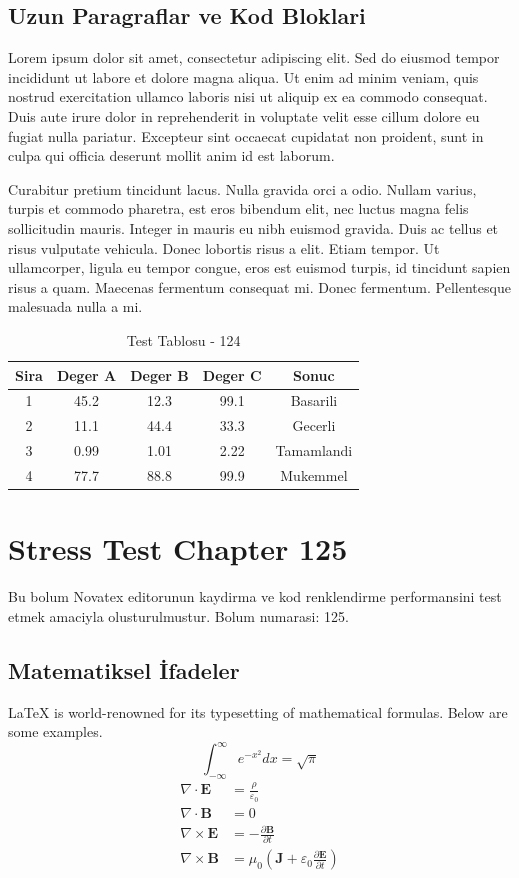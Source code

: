 \documentclass[12pt,a4paper]{article}
\begin{document}
\subsection{Uzun Paragraflar ve Kod Bloklari}
Lorem ipsum dolor sit amet, consectetur adipiscing elit. Sed do eiusmod tempor incididunt ut labore et dolore magna aliqua. Ut enim ad minim veniam, quis nostrud exercitation ullamco laboris nisi ut aliquip ex ea commodo consequat. Duis aute irure dolor in reprehenderit in voluptate velit esse cillum dolore eu fugiat nulla pariatur. Excepteur sint occaecat cupidatat non proident, sunt in culpa qui officia deserunt mollit anim id est laborum.

Curabitur pretium tincidunt lacus. Nulla gravida orci a odio. Nullam varius, turpis et commodo pharetra, est eros bibendum elit, nec luctus magna felis sollicitudin mauris. Integer in mauris eu nibh euismod gravida. Duis ac tellus et risus vulputate vehicula. Donec lobortis risus a elit. Etiam tempor. Ut ullamcorper, ligula eu tempor congue, eros est euismod turpis, id tincidunt sapien risus a quam. Maecenas fermentum consequat mi. Donec fermentum. Pellentesque malesuada nulla a mi.

\begin{table}[h!]
\centering
\begin{tabular}{|c|c|c|c|c|}
\hline
\textbf{Sira} & \textbf{Deger A} & \textbf{Deger B} & \textbf{Deger C} & \textbf{Sonuc} \\
\hline
1 & 45.2 & 12.3 & 99.1 & Basarili \\
2 & 11.1 & 44.4 & 33.3 & Gecerli \\
3 & 0.99 & 1.01 & 2.22 & Tamamlandi \\
4 & 77.7 & 88.8 & 99.9 & Mukemmel \\
\hline
\end{tabular}
\caption{Test Tablosu - 124}
\end{table}

\newpage
\section{Stress Test Chapter 125}
Bu bolum Novatex editorunun kaydirma ve kod renklendirme performansini test etmek amaciyla olusturulmustur. Bolum numarasi: 125.

\subsection{Matematiksel İfadeler}
\LaTeX{} is world-renowned for its typesetting of mathematical formulas. Below are some examples.
\begin{equation}
\int_{-\infty}^{\infty} e^{-x^2} dx = \sqrt{\pi}
\end{equation}
\begin{align}
\nabla \cdot \mathbf{E} &= \frac{\rho}{\varepsilon_0} \\
\nabla \cdot \mathbf{B} &= 0 \\
\nabla \times \mathbf{E} &= -\frac{\partial \mathbf{B}}{\partial t} \\
\nabla \times \mathbf{B} &= \mu_0\left(\mathbf{J} + \varepsilon_0 \frac{\partial \mathbf{E}}{\partial t}\right)
\end{align}
\end{document}
